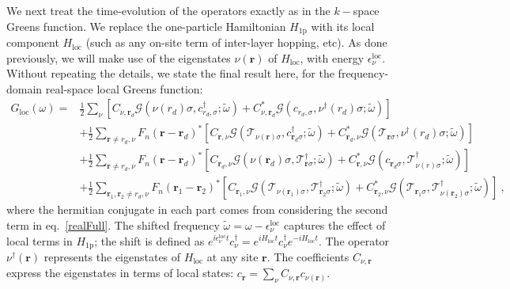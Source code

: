 We next treat the time-evolution of the operators exactly as in the \(k-\)space Greens function. We replace the one-particle Hamiltonian \(H_\text{1p}\) with its local component \(H_\text{loc}\) (such as any on-site term of inter-layer hopping, etc). As done previously, we will make use of the eigenstates \(\nu(\bm r)\) of \(H_\text{loc}\), with energy \(\epsilon_\nu^\text{loc}\).  Without repeating the details, we state the final result here, for the frequency-domain real-space local Greens function:
\begin{equation}\begin{aligned}\label{localTiledGreenF}
	G_\text{loc}(\omega) =& \frac{1}{2}\sum_\nu \left[C_{\nu,\bm r_d} \mathcal{G}(\nu(r_d)\sigma, c^\dagger_{r_d,\sigma}; \tilde\omega) + C^*_{\nu,\bm r_d} \mathcal{G}(c_{r_d,\sigma}, \nu^\dagger(r_d)\sigma; \tilde\omega)\right] \\
						  &+ \frac{1}{2}\sum_{\bm r \neq r_d, \nu} F_n(\bm r - \bm r_d)^* \left[C_{\bm r, \nu} \mathcal{G}(\mathcal{T}_{\nu(\bm r)\sigma},c^\dagger_{\bm r_d\sigma}; \tilde\omega) + C^*_{\bm r_d, \nu} \mathcal{G}(\mathcal{T}_{\bm r\sigma},\nu^\dagger(r_d)\sigma; \tilde\omega)\right]\\
						  &+ \frac{1}{2}\sum_{\bm r \neq r_d, \nu} F_n(\bm r - \bm r_d)^* \left[C_{\bm r_d, \nu} \mathcal{G}(\nu(\bm r_d)\sigma,\mathcal{T}^\dagger_{\bm r\sigma}; \tilde\omega) + C^*_{\bm r, \nu} \mathcal{G}(c_{\bm r_d\sigma},\mathcal{T}^\dagger_{\nu(r)\sigma}; \tilde\omega)\right]\\
						  &+ \frac{1}{2}\sum_{\bm r_1,\bm r_2 \neq r_d, \nu} F_n(\bm r_1 - \bm r_2)^* \left[C_{\bm r_1, \nu} \mathcal{G}(\mathcal{T}_{\nu(\bm r_1)\sigma},\mathcal{T}^\dagger_{\bm r_2\sigma}; \tilde\omega) + C^*_{\bm r_2, \nu} \mathcal{G}(\mathcal{T}_{\bm r_1\sigma},\mathcal{T}^\dagger_{\nu(\bm r_2)\sigma}; \tilde\omega)\right]~,
\end{aligned}\end{equation}
where the hermitian conjugate in each part comes from considering the second term in eq.~\ref{realFull}. The shifted frequency \(\tilde \omega = \omega - \epsilon_\nu^\text{loc}\) captures the effect of local terms in \(H_\text{1p}\); the shift is defined as \(e^{i \epsilon_\nu^\text{loc}t} c^\dagger_\nu = e^{i H_\text{loc} t} c^\dagger_\nu e^{-i H_\text{loc} t}\). The operator \(\nu^\dagger(\bm r)\) represents the eigenstates of \(H_\text{loc}\) at any site \(\bm r\). The coefficients \(C_{\nu,\bm r}\) express the eigenstates in terms of local states: \(c_{\bm r} = \sum_{\nu} C_{\nu, \bm r} c_{\nu(\bm r)}\).


